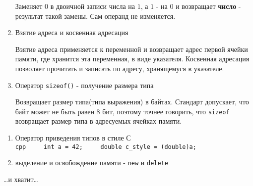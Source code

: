 \begin{enumerate}
\begin{Shaded}
\begin{Highlighting}[]
\OperatorTok{\textasciitilde{}}\OperatorTok{;}
\end{Highlighting}
\end{Shaded}

  Заменяет \(0\) в двоичной записи числа на \(1\), а \(1\) - на \(0\) и
  возвращает \textbf{число} - результат такой замены. Сам операнд не
  изменяется.
\item
  Взятие адреса и косвенная адресация

\begin{Shaded}
\begin{Highlighting}[]
 \OperatorTok{*}\OperatorTok{=} \OperatorTok{\&}\OperatorTok{;}
\OperatorTok{*}\OperatorTok{=} \OperatorTok{;}
\end{Highlighting}
\end{Shaded}

  Взятие адреса применяется к переменной и возвращает адрес первой
  ячейки памяти, где хранится эта переменная, в виде указателя.
  Косвенная адресация позволяет прочитать и записать по адресу,
  хранящемуся в указателе.
\item
  Оператор \texttt{sizeof()} - получение размера типа

\begin{Shaded}
\begin{Highlighting}[]
\OperatorTok{(}\OperatorTok{)}
\end{Highlighting}
\end{Shaded}

  Возвращает размер типа(типа выражения) в байтах. Стандарт допускает,
  что байт может не быть равен 8 бит, поэтому точнее говорить, что
  \texttt{sizeof} возвращает размер типа в адресуемых ячейках памяти.
\end{enumerate}

\begin{enumerate}
\def\labelenumi{\arabic{enumi})}
\setcounter{enumi}{6}
\item
  Оператор приведения типов в стиле С
  \texttt{cpp\ \ \ \ \ int\ a\ =\ 42;\ \ \ \ \ double\ c\_style\ =\ (double)a;}
\item
  выделение и освобождение памяти - \texttt{new} и \texttt{delete}

\begin{Shaded}
\begin{Highlighting}[]
 \OperatorTok{*}\OperatorTok{=}  \OperatorTok{;}
\OperatorTok{*}\OperatorTok{=} \OperatorTok{;}


\OperatorTok{;}
\end{Highlighting}
\end{Shaded}
\end{enumerate}

\ldots и хватит\ldots{}
